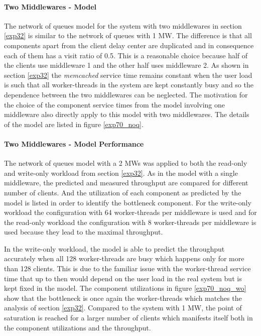 \documentclass[report.tex]{subfiles}
\begin{document}
\paragraph{Two Middlewares - Model}

The network of queues model for the system with two middlewares in section \ref{exp32} is similar to the network of queues with 1 MW.
The difference is that all components apart from the client delay center are duplicated and in consequence each of them has a visit ratio of 0.5.
This is a reasonable choice because half of the clients use middleware 1 and the other half uses middleware 2. As shown in section \ref{exp32} the \emph{memcached} service time remains constant when the user load is such that all worker-threads in the system are kept constantly busy and so the dependence between the two middlewares can be neglected. The motivation for the choice of the component service times from the model involving one middleware also directly apply to this model with two middlewares.
The details of the model are listed in figure \ref{exp70_noq}.

\paragraph{Two Middlewares - Model Performance}
The network of queues model with a 2 MWs was applied to both the read-only and write-only workload from section \ref{exp32}.
As in the model with a single middleware, the predicted and measured throughput are compared for different number of clients.
And the utilization of each component as predicted by the model is listed in order to identify the bottleneck component. For the write-only workload the configuration with 64 worker-threads per middleware is used and for the read-only workload the configuration with 8 worker-threads per middleware is used because they lead to the maximal throughput.

In the write-only workload, the model is able to predict the throughput accurately when all 128 worker-threads are busy which happens only for more than 128 clients. This is due to the familiar issue with the worker-thread service time that up to then would depend on the user load in the real system but is kept fixed in the model.
The component utilizations in figure \ref{exp70_noq_wo} show that the bottleneck is once again the worker-threads which matches the analysis of section \ref{exp32}.  Compared to the system with 1 MW, the point of saturation is reached for a larger number of clients which manifests itself both in the component utilizations and the throughput.
\end{document}
